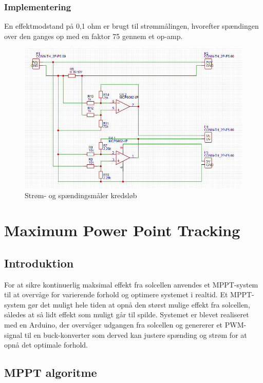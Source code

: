\documentclass[../main.tex]{subfiles}
\begin{document}
        \subsubsection{Implementering}

        En effektmodstand på 0,1 ohm er brugt til strømmålingen, hvorefter spændingen over den ganges op med en faktor 75 gennem et op-amp.

        \begin{figure}[H]
        \includegraphics[width=\textwidth]{Dokumentation/målekredsløb.png}
        \caption{Strøm- og spændingsmåler kredsløb}
        \label{fig: Strøm- og spændingsmåler kredsløb}
        \end{figure}

\section{Maximum Power Point Tracking}

    \subsection{Introduktion}

    For at sikre kontinuerlig maksimal effekt fra solcellen anvendes et MPPT-system til at overvåge for varierende forhold og optimere systemet i realtid. Et MPPT-system gør det muligt hele tiden at opnå den størst mulige effekt fra solcellen, således at så lidt effekt som muligt går til spilde. Systemet er blevet realiseret med en Arduino, der overvåger udgangen fra solcellen og genererer et PWM-signal til en buck-konverter som derved kan justere spænding og strøm for at opnå det optimale forhold. 

    \subsection{MPPT algoritme}
\end{document}
